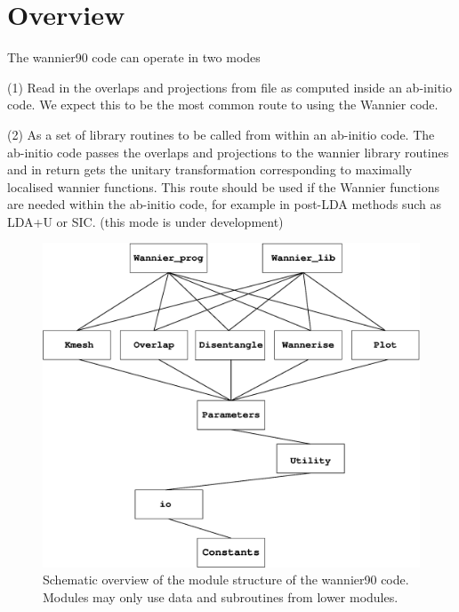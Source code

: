 \chapter{Overview}
The wannier90 code can operate in two modes

(1) Read in the overlaps and projections from file as computed 
inside an ab-initio code. We expect this to be the most common route to using the Wannier code.


(2) As a set of library routines to be called from within an ab-initio code. 
The ab-initio code passes the overlaps and projections to the wannier library routines
and in return gets the unitary transformation corresponding to maximally localised wannier functions.
This route should be used if the Wannier functions are needed within the ab-initio code, for example
in post-LDA methods such as LDA+U or SIC. (this mode is under development)



\begin{figure}
\begin{center}
\includegraphics[width=5in]{overview.eps}
\caption{Schematic overview of the module structure of the wannier90 code. Modules may only use data
and subroutines from lower modules.}
\label{structure}
\end{center}
\end{figure}
